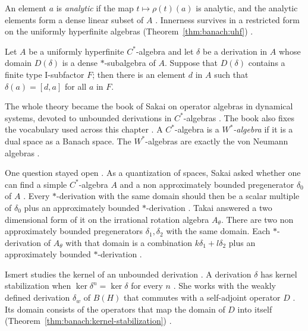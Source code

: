 An element $a$ is \emph{analytic} if the map $t\mapsto\rho(t)(a)$ is
analytic, and the analytic elements form a dense linear subset of $A$
\cite[p.~428]{Sakai1976OneParameter}. Innerness survives in a restricted
form on the uniformly hyperfinite algebras (Theorem~\ref{thm:banach:uhf})
\cite[Theorem~2, p.~435]{Sakai1976OneParameter}.\begin{theorem}\label{thm:banach:uhf}
Let $A$ be a uniformly hyperfinite $C^*$-algebra and let $\delta$ be a
derivation in $A$ whose domain $D(\delta)$ is a dense $*$-subalgebra of
$A$. Suppose that $D(\delta)$ contains a finite type I-subfactor $F$;
then there is an element $d$ in $A$ such that $\delta(a)=[d,a]$ for all
$a$ in $F$.
\end{theorem}

The whole theory became the book of Sakai on operator algebras in dynamical
systems, devoted to unbounded derivations in $C^*$-algebras
\cite{Sakai1991Dynamical}. The book also fixes the vocabulary used across this
chapter \cite[p.~2]{Sakai1991Dynamical}. A $C^*$-algebra is a
\emph{$W^*$-algebra} if it is a dual space as a Banach space. The
$W^*$-algebras are exactly the von Neumann algebras
\cite[p.~2]{Sakai1991Dynamical}.

One question stayed open \cite[p.~202]{Takai1981SakaiProblem}. As a
quantization of spaces, Sakai asked whether one can find a simple
$C^*$-algebra $A$ and a non approximately bounded pregenerator $\delta_0$ of
$A$ \cite[p.~202]{Takai1981SakaiProblem}. Every $*$-derivation with the same
domain should then be a scalar multiple of $\delta_0$ plus an approximately
bounded $*$-derivation \cite[p.~202]{Takai1981SakaiProblem}. Takai answered a
two dimensional form of it on the irrational rotation algebra $A_\theta$.
There are two non approximately bounded pregenerators $\delta_1,\delta_2$ with
the same domain. Each $*$-derivation of $A_\theta$ with that domain is a
combination $k\delta_1+l\delta_2$ plus an approximately bounded $*$-derivation
\cite[p.~202]{Takai1981SakaiProblem}.

Ismert studies the kernel of an unbounded derivation
\cite[p.~1]{Ismert2018Kernel}. A derivation $\delta$ has kernel stabilization
when $\ker\delta^{n}=\ker\delta$ for every $n$ \cite[p.~1]{Ismert2018Kernel}.
She works with the weakly defined derivation $\delta_{w}$ of $B(H)$ that
commutes with a self-adjoint operator $D$ \cite[p.~1]{Ismert2018Kernel}. Its
domain consists of the operators that map the domain of $D$ into itself
(Theorem~\ref{thm:banach:kernel-stabilization}) \cite[p.~3]{Ismert2018Kernel}.

